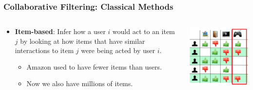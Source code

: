 \documentclass[11pt,aspectratio=169]{beamer}
\begin{document}
	\begin{frame}
		\frametitle{Collaborative Filtering: Classical Methods}
		\begin{columns}
			\begin{column}{0.5\textwidth}
				\begin{itemize}
					\item \textbf{\alert<1>{Item}-based}: Infer how a user $i$ would act to an item $j$ by looking at how \alert<1>{items} that have similar interactions to \alert<1>{item $j$} were being acted by \alert<1>{user $i$}.
					\begin{itemize}
						\item Amazon used to have fewer items than users.
						\item<2-> Now we also have millions of items.
					\end{itemize}
				\end{itemize}
			\end{column}
			\begin{column}{0.5\textwidth}
				\begin{center}
					\centering
					\includegraphics[width=\textwidth]{images/cf-stage3-alter.png}
				\end{center}
			\end{column}
		\end{columns}
	\end{frame}
\end{document}
